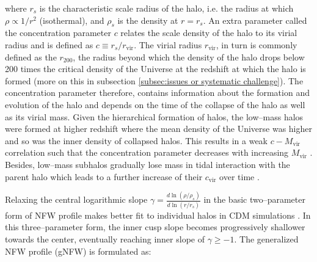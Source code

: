 \documentclass[paper=a4, fontsize=11pt]{scrartcl} %
\numberwithin{equation}{section} %
\numberwithin{figure}{section} %
\numberwithin{table}{section} %
\begin{document}
where $r_s$ is the characteristic scale radius of the halo, i.e. the radius at which $\rho \propto 1/r^2$ (isothermal), and $\rho_s$ is the density at $r=r_s$. An extra parameter called the concentration parameter $c$ relates the scale density of the halo to its virial radius and is defined as $c\equiv r_s/r_\mathrm{vir}$. The virial radius $r_\mathrm{vir}$, in turn is commonly defined as the $r_{200}$, the radius beyond which the density of the halo drops below 200 times the critical density of the Universe at the redshift at which the halo is formed (more on this in subsection \ref{subsec:issues or systematic challenge}). The concentration parameter therefore, contains information about the formation and evolution of the halo and depends on the time of the collapse of the halo as well as its virial mass. Given the hierarchical formation of halos, the low--mass halos were formed at higher redshift where the mean density of the Universe was higher and so was the inner density of collapsed halos. This results in a weak $c-M_\mathrm{vir}$ correlation such that the concentration parameter decreases with increasing $M_\mathrm{vir}$ \citep[][]{}. Besides, low--mass subhalos gradually lose mass in tidal interaction with the parent halo which leads to a further increase of their $c_\mathrm{vir}$ over time \citep{Bullock+2001, Maccio2008}.

Relaxing the central logarithmic slope $\gamma = \frac{d\ln(\rho/\rho_s)}{d\ln(r/r_s)}$ in the basic two--parameter form of NFW profile makes better fit to individual halos in CDM simulations \citep[][]{}. In this three--parameter form, the inner cusp slope becomes progressively shallower towards the center, eventually reaching inner slope of $\gamma\geq-1$. The generalized NFW profile (gNFW) is formulated as:
\end{document}
